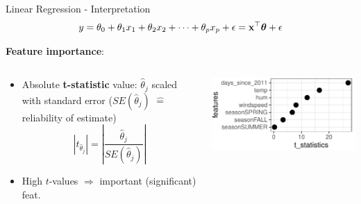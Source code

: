 \documentclass[10pt,compress,t,notes=noshow, xcolor=table]{beamer}
\begin{document}
     
\begin{frame}{Linear Regression - Interpretation}
\vspace{-0.2cm}
 $$y = \theta_0 + \theta_1 x_1 + \theta_2 x_2 + \dots + \theta_p x_p + \epsilon = \mathbf{x}^\top \bm{\theta} + \epsilon$$

    \textbf{Feature importance}:
    \begin{columns}[T, totalwidth=\textwidth]
    \begin{column}{0.61\textwidth}
    \begin{itemize}
        \item Absolute \textbf{t-statistic} value: $\hat\theta_j$ scaled with standard error ($SE(\hat\theta_j)$ $\hat =$ reliability of estimate) 
    $$|t_{\hat\theta_j}| = \left| \frac{\hat\theta_j}{SE(\hat\theta_j)} \right|$$
        \item High $t$-values $\Rightarrow$ important (significant) feat.
    \end{itemize}
    \end{column}
    \begin{column}{0.39\textwidth}
        \includegraphics[width=\textwidth]{figure/t_stat.pdf} 
    \end{column}
    \end{columns}
    \vspace{0.3cm}
\end{frame}
\end{document}
